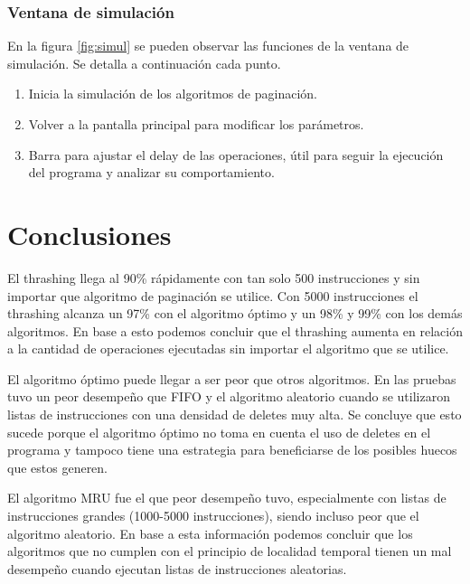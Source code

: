 \documentclass{report}
\begin{document}
\subsection{Ventana de simulación}
En la figura  \ref{fig:simul} se pueden observar las funciones de la ventana de simulación. Se detalla a continuación cada punto.

\begin{enumerate}
	\item Inicia la simulación de los algoritmos de paginación.
	\item Volver a la pantalla principal para modificar los parámetros.
	\item Barra para ajustar el delay de las operaciones, útil para seguir la ejecución del programa y analizar su comportamiento.
\end{enumerate}

\chapter{Conclusiones}

El thrashing llega al 90\% rápidamente con tan solo 500 instrucciones y sin importar que algoritmo de paginación se utilice.  Con 5000 instrucciones el thrashing alcanza un 97\% con el algoritmo óptimo y un 98\% y 99\% con los demás algoritmos. En base a esto podemos concluir que el thrashing aumenta en relación a la cantidad de operaciones ejecutadas sin importar el algoritmo que se utilice.

El algoritmo óptimo puede llegar a ser peor que otros algoritmos. En las pruebas tuvo un peor desempeño que FIFO y el algoritmo aleatorio cuando se utilizaron listas de instrucciones con una densidad de deletes muy alta. Se concluye que esto sucede porque el algoritmo óptimo no toma en cuenta el uso de deletes en el programa y tampoco tiene una estrategia para beneficiarse de los posibles huecos que estos generen.

El algoritmo MRU fue el que peor desempeño tuvo, especialmente con listas de instrucciones grandes (1000-5000 instrucciones), siendo incluso peor que el algoritmo aleatorio. En base a esta información podemos concluir que los algoritmos que no cumplen con el principio de localidad temporal tienen un mal desempeño cuando ejecutan listas de instrucciones aleatorias.



%

\end{document}
